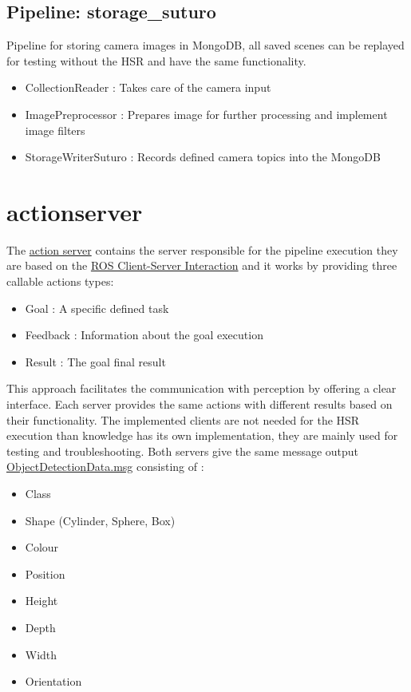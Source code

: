 \documentclass[main.tex]{subfiles}
\begin{document}
			\subsection{Pipeline: storage\_suturo} 
Pipeline for storing camera images in MongoDB, all saved scenes can be replayed for testing without the HSR and have the same functionality. 
\begin{itemize}
	\item CollectionReader : Takes care of the camera input
	\item ImagePreprocessor : Prepares image for further processing and implement image filters 
	\item StorageWriterSuturo :  Records defined camera topics into the MongoDB
\end{itemize}

		\section{actionserver}
The \href{https://github.com/SUTURO/suturo_perception/tree/master/actionserver}{action server} contains the server responsible for the pipeline execution they are based on the \href{http://wiki.ros.org/actionlib}{ROS Client-Server Interaction} and it works by providing three callable actions types:
\begin{itemize}
	\item Goal : A specific defined task 
	\item Feedback : Information about the goal execution  
	\item Result : The goal final result 
\end{itemize}
This approach facilitates the communication with perception by offering a clear interface.
Each server provides the same actions with different results based on their functionality.
The implemented clients are not needed for the HSR execution than knowledge has its own implementation, they are mainly used for testing and troubleshooting. 
Both servers give the same message output \href{https://github.com/SUTURO/suturo_resources/blob/master/messages/suturo_perception_msgs/msg/ObjectDetectionData.msg}{ObjectDetectionData.msg} consisting of : 

	\begin{itemize}
	\item Class
	\item Shape (Cylinder, Sphere, Box)
	\item Colour
	\item Position
	\item Height
	\item Depth
	\item Width
	\item Orientation
	\end{itemize}
\end{document}
